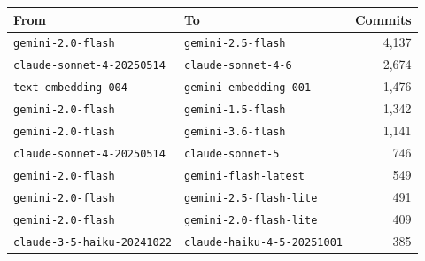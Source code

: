 \begin{tabular}{llr}
\toprule
From & To & Commits \\
\midrule
\texttt{gemini-2.0-flash} & \texttt{gemini-2.5-flash} & 4,137 \\
\texttt{claude-sonnet-4-20250514} & \texttt{claude-sonnet-4-6} & 2,674 \\
\texttt{text-embedding-004} & \texttt{gemini-embedding-001} & 1,476 \\
\texttt{gemini-2.0-flash} & \texttt{gemini-1.5-flash} & 1,342 \\
\texttt{gemini-2.0-flash} & \texttt{gemini-3.6-flash} & 1,141 \\
\texttt{claude-sonnet-4-20250514} & \texttt{claude-sonnet-5} & 746 \\
\texttt{gemini-2.0-flash} & \texttt{gemini-flash-latest} & 549 \\
\texttt{gemini-2.0-flash} & \texttt{gemini-2.5-flash-lite} & 491 \\
\texttt{gemini-2.0-flash} & \texttt{gemini-2.0-flash-lite} & 409 \\
\texttt{claude-3-5-haiku-20241022} & \texttt{claude-haiku-4-5-20251001} & 385 \\
\bottomrule
\end{tabular}
